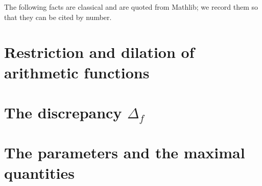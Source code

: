The following facts are classical and are quoted from Mathlib; we record them so that they can be
cited by number.





\section{Restriction and dilation of arithmetic functions}






\section{The discrepancy \texorpdfstring{$\Delta_f$}{Delta\_f}}







\section{The parameters and the maximal quantities}





